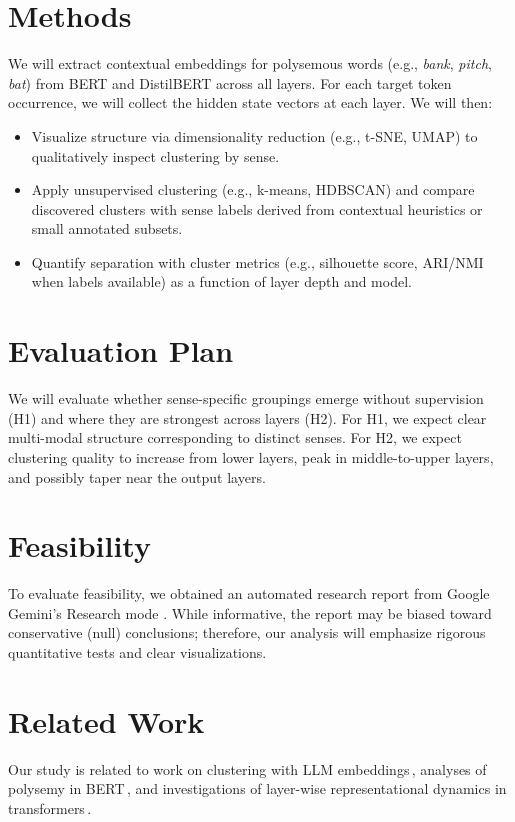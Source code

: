 \documentclass{template}
\begin{document}
\newpage


\section*{Methods}
We will extract contextual embeddings for polysemous words (e.g., \textit{bank}, \textit{pitch}, \textit{bat}) from BERT and DistilBERT across all layers. For each target token occurrence, we will collect the hidden state vectors at each layer. We will then:
\begin{itemize}
    \item Visualize structure via dimensionality reduction (e.g., t\textsc{-}SNE, UMAP) to qualitatively inspect clustering by sense.
    \item Apply unsupervised clustering (e.g., k-means, HDBSCAN) and compare discovered clusters with sense labels derived from contextual heuristics or small annotated subsets.
    \item Quantify separation with cluster metrics (e.g., silhouette score, ARI/NMI when labels available) as a function of layer depth and model.
\end{itemize}


\section*{Evaluation Plan}
We will evaluate whether sense-specific groupings emerge without supervision (H1) and where they are strongest across layers (H2). For H1, we expect clear multi-modal structure corresponding to distinct senses. For H2, we expect clustering quality to increase from lower layers, peak in middle-to-upper layers, and possibly taper near the output layers.


\section*{Feasibility}
To evaluate feasibility, we obtained an automated research report from Google Gemini's Research mode \cite{gemini2025}. While informative, the report may be biased toward conservative (null) conclusions; therefore, our analysis will emphasize rigorous quantitative tests and clear visualizations.

\newpage


\section*{Related Work}
Our study is related to work on clustering with LLM embeddings\,\cite{petukhova2025}, analyses of polysemy in BERT\,\cite{yenicelik2020}, and investigations of layer-wise representational dynamics in transformers\,\cite{nadipalli2025}.

\vspace{0.2in}

\makecitations%
\vfill
\pagebreak
\end{document}
